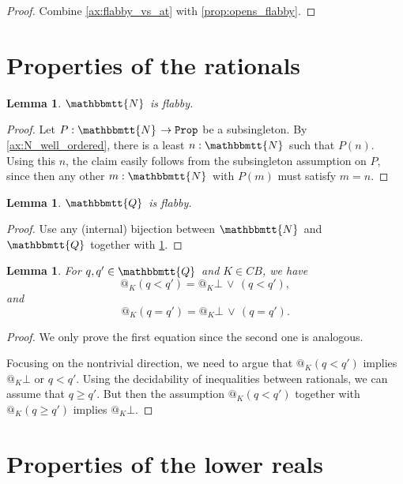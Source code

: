 \documentclass[11pt, oneside, article]{memoir}
\makeatletter
\theoremstyle{plain}
\newtheorem{lemma}[theorem]{Lemma}
\theoremstyle{definition}
\theoremstyle{remark}
\newcommand{\const}[1]{\mathtt{#1}}
\newcommand{\internal}[1]{\raisebox{-.03ex}{$\mathbbmtt{#1}$}}
\newcommand{\hs}{\hspace{1.1pt}}
\newcommand{\tNN}{\internal{N}\hs}
\newcommand{\tQQ}{\internal{Q}\hs}
\newcommand{\Prop}{\const{Prop}}
\newcommand{\BaseSpace}{B}
\newcommand{\CB}{C\BaseSpace}
\newcommand{\AtSymbol}{{@}}
\newcommand{\At}[2][]{\AtSymbol^{#1}_{#2}}
\makeatother
\begin{document}
\begin{proof}
	Combine \cref{ax:flabby_vs_at} with \cref{prop:opens_flabby}.	
\end{proof}

\section{Properties of the rationals}

\begin{lemma}
	$\tNN$ is flabby.
	\label{lem:N_flabby}
\end{lemma}

\begin{proof}
	Let $P : \tNN \to \Prop$ be a subsingleton. By \cref{ax:N_well_ordered}, there is a least $n : \tNN$ such that $P(n)$. Using this $n$, the claim easily follows from the subsingleton assumption on $P$, since then any other $m:\tNN$ with $P(m)$ must satisfy $m = n$.
\end{proof}

\begin{lemma}
	$\tQQ$ is flabby.
	\label{lem:Q_flabby}
\end{lemma}

\begin{proof}
	Use any (internal) bijection between $\tNN$ and $\tQQ$ together with \cref{lem:N_flabby}.
\end{proof}

\begin{lemma}
	\label{lem:rational_compare_at}
	For $q,q'\in\tQQ$ and $K\in\CB$, we have
	\[
		\At{K}(q < q') = \At{K}\bot \, \lor \, (q < q'),
	\]
	and
	\[
		\At{K}(q = q') = \At{K}\bot \, \lor \, (q = q').
	\]
\end{lemma}

\begin{proof}
	We only prove the first equation since the second one is analogous.

	Focusing on the nontrivial direction, we need to argue that $\At{K}(q < q')$ implies $\At{K}\bot$ or $q < q'$. Using the decidability of inequalities between rationals, we can assume that $q \geq q'$. But then the assumption $\At{K}(q < q')$ together with $\At{K}(q \geq q')$ implies $\At{K}\bot$.
\end{proof}

\section{Properties of the lower reals}
\end{document}
